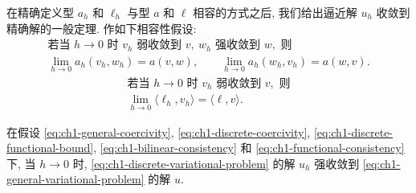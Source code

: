 在精确定义型 $a_h$ 和 $\ell_h$ 与型 $a$ 和 $\ell$ 相容的方式之后, 我们给出逼近解 $u_h$ 收敛到精确解的一般定理. 作如下相容性假设:
\begin{equation}
\begin{gathered}
\text{若当 }h\to0\text{ 时 }v_h\text{ 弱收敛到 }v,\ w_h\text{ 强收敛到 }w,\text{ 则}\\
\lim_{h\to0}a_h(v_h,w_h)=a(v,w),\qquad
\lim_{h\to0}a_h(w_h,v_h)=a(w,v).
\end{gathered}
\label{eq:ch1-bilinear-consistency}
\end{equation}
\begin{equation}
\begin{gathered}
\text{若当 }h\to0\text{ 时 }v_h\text{ 弱收敛到 }v,\text{ 则}\\
\lim_{h\to0}\langle\ell_h,v_h\rangle=\langle\ell,v\rangle.
\end{gathered}
\label{eq:ch1-functional-consistency}
\end{equation}

\begin{Theorem}
\label{thm:ch1-general-approximation-convergence}
在假设 \eqref{eq:ch1-general-coercivity}, \eqref{eq:ch1-discrete-coercivity}, \eqref{eq:ch1-discrete-functional-bound}, \eqref{eq:ch1-bilinear-consistency} 和 \eqref{eq:ch1-functional-consistency} 下, 当 $h\to0$ 时, \eqref{eq:ch1-discrete-variational-problem} 的解 $u_h$ 强收敛到 \eqref{eq:ch1-general-variational-problem} 的解 $u$.
\end{Theorem}

